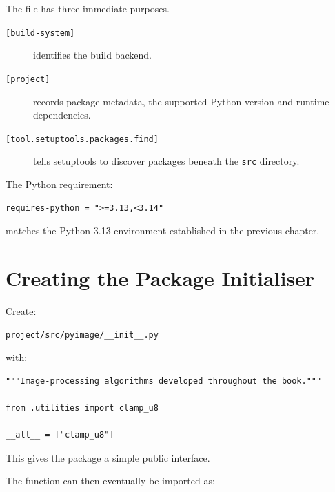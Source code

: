 The file has three immediate purposes.

\begin{description}

    \item[\texttt{[build-system]}]
    identifies the build backend.

    \item[\texttt{[project]}]
    records package metadata, the supported Python version and runtime
    dependencies.

    \item[\texttt{[tool.setuptools.packages.find]}]
    tells setuptools to discover packages beneath the
    \texttt{src} directory.

\end{description}

The Python requirement:

\begin{verbatim}
requires-python = ">=3.13,<3.14"
\end{verbatim}

matches the Python 3.13 environment established in the previous
chapter.


\section{Creating the Package Initialiser}
\label{sec:package-initialiser}

Create:

\begin{verbatim}
project/src/pyimage/__init__.py
\end{verbatim}

with:

\begin{listing}[htbp]
    \caption{Initial \texttt{pyimage} package initialiser.}
    \label{lst:pyimage-init}

\begin{verbatim}
"""Image-processing algorithms developed throughout the book."""

from .utilities import clamp_u8

__all__ = ["clamp_u8"]
\end{verbatim}

\end{listing}

This gives the package a simple public interface.

The function can then eventually be imported as:

